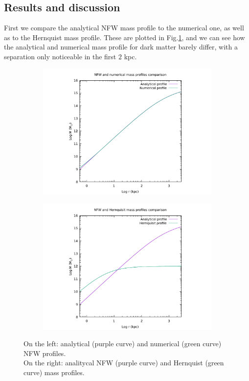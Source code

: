 \documentclass{article}
\begin{document}
\subsection{Results and discussion}
First we compare the analytical NFW mass profile to the numerical one, as well as to the Hernquist mass profile. These are plotted in Fig.\ref{fig:massprofiles}, and we can see how the analytical and numerical mass profile for dark matter barely differ, with a separation only noticeable in the first $2$ kpc.
\begin{figure}[H]
	
	\begin{subfigure}{0.49\textwidth}
		\includegraphics[width=1\linewidth]{dm_mass_profile.pdf}
	\end{subfigure}
	\begin{subfigure}{0.49\textwidth}
		\includegraphics[width=1\linewidth]{mass_profiles.pdf}
	\end{subfigure}
	\centering
	\caption{On the left: analytical (purple curve) and numerical (green curve) NFW profiles. \\On the right: analitycal NFW (purple curve) and Hernquist (green curve) mass profiles.}
	\label{fig:massprofiles}
\end{figure}
\end{document}
